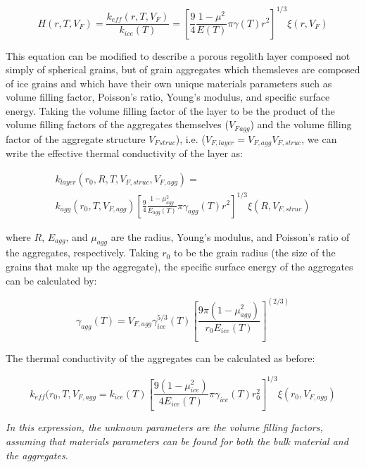 \documentclass[11pt]{article} %
\newcommand{\vf}{\ensuremath{V_{F}}\xspace}
\begin{document}
	 \begin{equation}
	 \label{eq:hertz}
	 H(r, T, \vf) = \frac{k_{eff}(r, T, \vf)}{k_{ice}(T)} = [\frac{9}{4} \frac{1-\mu^{2}}{E(T)} \pi \gamma(T) r^{2} ]^{1/3} \xi(r, \vf)
	 \end{equation}
	 
	 This equation can be modified to describe a porous regolith layer composed not simply of spherical grains, but of grain aggregates which themsleves are composed of ice grains and which have their own unique materials parameters such as volume filling factor, Poisson's ratio, Young's modulus, and specific surface energy. Taking the volume filling factor of the layer to be the product of the volume filling factors of the aggregates themselves (\vf$_{agg}$) and the volume filling factor of the aggregate structure \vf$_{struc}$), i.e. ($V_{F, layer} = V_{F, agg} V_{F, struc}$, we can write the effective thermal conductivity of the layer as:
	 
	 \begin{equation}
	 \begin{split}
	 k_{layer}(r_{0}, R, T, V_{F, struc}, V_{F, agg}) = \\
	 k_{agg}(r_{0}, T, V_{F, agg}) [\frac{9}{4} \frac{1 - \mu_{agg}^{2}}{E_{agg}(T)}  \pi \gamma_{agg}(T) r^{2}]^{1/3} \xi(R, V_{F, struc})
	 \end{split}
	 \end{equation}
	 
	 where $R$, $E_{agg}$, and $\mu_{agg}$ are the radius, Young's modulus, and Poisson's ratio of the aggregates, respectively. Taking $r_{0}$ to be the grain radius (the size of the grains that make up the aggregate), the specific surface energy of the aggregates can be calculated by:
	 
	 \begin{equation}
	 \gamma_{agg}(T) = V_{F, agg} \gamma_{ice}^{5/3}(T)[\frac{9 \pi (1-\mu_{agg}^{2})}{r_{0} E_{ice}(T)}]^(2/3)
	 \end{equation}
	 
	 The thermal conductivity of the aggregates can be calculated as before:
	 
	 \begin{equation}
	 k_{eff}(r_{0}, T, V_{F, agg} = k_{ice}(T) [\frac{9 (1-\mu_{ice}^{2})}{4 E_{ice}(T)}\pi \gamma_{ice}(T) r_{0}^{2} ]^{1/3}\xi(r_{0}, V_{F, agg})
	 \end{equation}
	 
	\emph{ In this expression, the unknown parameters are the volume filling factors, assuming that materials parameters can be found for both the bulk material and the aggregates.}
	
\end{document}
